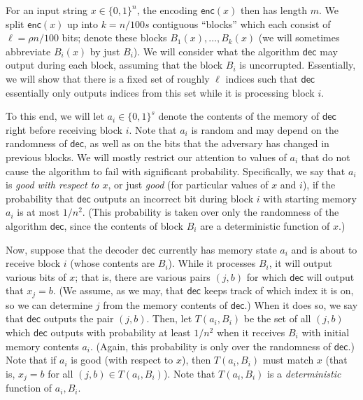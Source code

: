 For an input string $x\in\{0,1\}^{n}$, the encoding $\mathsf{enc}(x)$ then has length $m$. We split $\mathsf{enc}(x)$ up into $k=n/100s$ contiguous “blocks” which each consist of $\ell=\rho n/100$ bits; denote these blocks $B_{1}(x),\dots,B_{k}(x)$ (we will sometimes abbreviate $B_{i}(x)$ by just $B_{i}$). We will consider what the algorithm $\mathsf{dec}$ may output during each block, assuming that the block $B_{i}$ is uncorrupted. Essentially, we will show that there is a fixed set of roughly $\ell$ indices such that $\mathsf{dec}$ essentially only outputs indices from this set while it is processing block $i$.\par




To this end, we will let $a_{i}\in\{0,1\}^{s}$ denote the contents of the memory of $\mathsf{dec}$ right before receiving block $i$. Note that $a_{i}$ is random and may depend on the randomness of $\mathsf{dec}$, as well as on the bits that the adversary has changed in previous blocks. We will mostly restrict our attention to values of $a_{i}$ that do not cause the algorithm to fail with significant probability. Specifically, we say that $a_{i}$ is \emph{good with respect to $x$}, or just \emph{good} (for particular values of $x$ and $i$), if the probability that $\mathsf{dec}$ outputs an incorrect bit during block $i$ with starting memory $a_{i}$ is at most $1/n^{2}$. (This probability is taken over only the randomness of the algorithm $\mathsf{dec}$, since the contents of block $B_{i}$ are a deterministic function of $x$.)\par




Now, suppose that the decoder $\mathsf{dec}$ currently has memory state $a_{i}$ and is about to receive block $i$ (whose contents are $B_{i}$). While it processes $B_{i}$, it will output various bits of $x$; that is, there are various pairs $(j,b)$ for which $\mathsf{dec}$ will output that $x_{j}=b$. (We assume, as we may, that $\mathsf{dec}$ keeps track of which index it is on, so we can determine $j$ from the memory contents of $\mathsf{dec}$.) When it does so, we say that $\mathsf{dec}$ outputs the pair $(j,b)$. Then, let $T(a_{i},B_{i})$ be the set of all $(j,b)$ which $\mathsf{dec}$ outputs with probability at least $1/n^{2}$ when it receives $B_{i}$ with initial memory contents $a_{i}$. (Again, this probability is only over the randomness of $\mathsf{dec}$.) Note that if $a_{i}$ is good (with respect to $x$), then $T(a_{i},B_{i})$ must match $x$ (that is, $x_{j}=b$ for all $(j,b)\in T(a_{i},B_{i})$). Note that $T(a_{i},B_{i})$ is a \emph{deterministic} function of $a_{i},B_{i}$.\par




